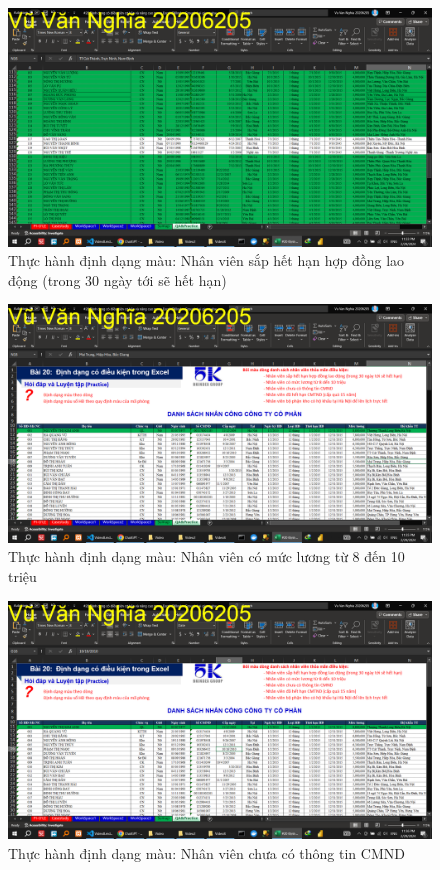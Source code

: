 \documentclass{article}
\begin{document}
\begin{figure}[H]
\centering
\includegraphics[scale = 0.15]{Video8/ThucHanh/2.png}
\caption{Thực hành định dạng màu: Nhân viên sắp hết hạn hợp đồng lao động (trong 30 ngày tới sẽ hết hạn)}
\end{figure}

\begin{figure}[H]
\centering
\includegraphics[scale = 0.15]{Video8/ThucHanh/3.png}
\caption{Thực hành định dạng màu: Nhân viên có mức lương từ 8 đến 10 triệu}
\end{figure}

\begin{figure}[H]
\centering
\includegraphics[scale = 0.15]{Video8/ThucHanh/4.png}
\caption{Thực hành định dạng màu: Nhân viên chưa có thông tin CMND}
\end{figure}
\end{document}
